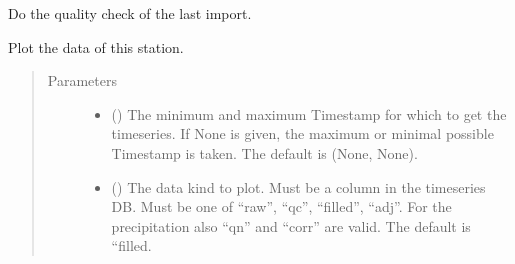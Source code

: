 \documentclass[letterpaper,10pt,english]{sphinxmanual}
\begin{document}
\begin{fulllineitems}

\begin{fulllineitems}
\label{\detokenize{weatherDB:weatherDB.station.StationBase.last_imp_quality_check}}
\sphinxAtStartPar
Do the quality check of the last import.

\end{fulllineitems}


\begin{fulllineitems}
\label{\detokenize{weatherDB:weatherDB.station.StationBase.plot}}
\sphinxAtStartPar
Plot the data of this station.
\begin{quote}\begin{description}
\item[{Parameters}] \leavevmode\begin{itemize}
\item {} 
\sphinxAtStartPar
{} ({\hyperref[\detokenize{weatherDB.lib:weatherDB.lib.utils.TimestampPeriod}]{}}\sphinxstyleliteralemphasis{\sphinxupquote{(}}\sphinxstyleliteralemphasis{\sphinxupquote{)}}\sphinxstyleliteralemphasis{\sphinxupquote{, }}) \textendash{} The minimum and maximum Timestamp for which to get the timeseries.
If None is given, the maximum or minimal possible Timestamp is taken.
The default is (None, None).

\item {} 
\sphinxAtStartPar
{} (\sphinxstyleliteralemphasis{\sphinxupquote{, }}) \textendash{} The data kind to plot.
Must be a column in the timeseries DB.
Must be one of “raw”, “qc”, “filled”, “adj”.
For the precipitation also “qn” and “corr” are valid.
The default is “filled.


\end{itemize}
\end{description}
\end{quote}
\end{fulllineitems}
\end{fulllineitems}
\end{document}
